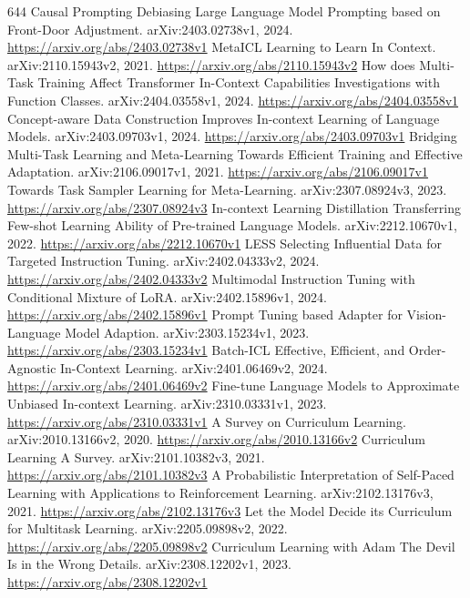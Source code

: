 \documentclass[11pt]{article}
\begin{document}
\begin{thebibliography}{644}
 Causal Prompting Debiasing Large Language Model Prompting based on Front-Door Adjustment. arXiv:2403.02738v1, 2024. \url{https://arxiv.org/abs/2403.02738v1}
 MetaICL Learning to Learn In Context. arXiv:2110.15943v2, 2021. \url{https://arxiv.org/abs/2110.15943v2}
 How does Multi-Task Training Affect Transformer In-Context Capabilities Investigations with Function Classes. arXiv:2404.03558v1, 2024. \url{https://arxiv.org/abs/2404.03558v1}
 Concept-aware Data Construction Improves In-context Learning of Language Models. arXiv:2403.09703v1, 2024. \url{https://arxiv.org/abs/2403.09703v1}
 Bridging Multi-Task Learning and Meta-Learning Towards Efficient Training and Effective Adaptation. arXiv:2106.09017v1, 2021. \url{https://arxiv.org/abs/2106.09017v1}
 Towards Task Sampler Learning for Meta-Learning. arXiv:2307.08924v3, 2023. \url{https://arxiv.org/abs/2307.08924v3}
 In-context Learning Distillation Transferring Few-shot Learning Ability of Pre-trained Language Models. arXiv:2212.10670v1, 2022. \url{https://arxiv.org/abs/2212.10670v1}
 LESS Selecting Influential Data for Targeted Instruction Tuning. arXiv:2402.04333v2, 2024. \url{https://arxiv.org/abs/2402.04333v2}
 Multimodal Instruction Tuning with Conditional Mixture of LoRA. arXiv:2402.15896v1, 2024. \url{https://arxiv.org/abs/2402.15896v1}
 Prompt Tuning based Adapter for Vision-Language Model Adaption. arXiv:2303.15234v1, 2023. \url{https://arxiv.org/abs/2303.15234v1}
 Batch-ICL Effective, Efficient, and Order-Agnostic In-Context Learning. arXiv:2401.06469v2, 2024. \url{https://arxiv.org/abs/2401.06469v2}
 Fine-tune Language Models to Approximate Unbiased In-context Learning. arXiv:2310.03331v1, 2023. \url{https://arxiv.org/abs/2310.03331v1}
 A Survey on Curriculum Learning. arXiv:2010.13166v2, 2020. \url{https://arxiv.org/abs/2010.13166v2}
 Curriculum Learning A Survey. arXiv:2101.10382v3, 2021. \url{https://arxiv.org/abs/2101.10382v3}
 A Probabilistic Interpretation of Self-Paced Learning with Applications to Reinforcement Learning. arXiv:2102.13176v3, 2021. \url{https://arxiv.org/abs/2102.13176v3}
 Let the Model Decide its Curriculum for Multitask Learning. arXiv:2205.09898v2, 2022. \url{https://arxiv.org/abs/2205.09898v2}
 Curriculum Learning with Adam The Devil Is in the Wrong Details. arXiv:2308.12202v1, 2023. \url{https://arxiv.org/abs/2308.12202v1}

\end{thebibliography}
\end{document}
